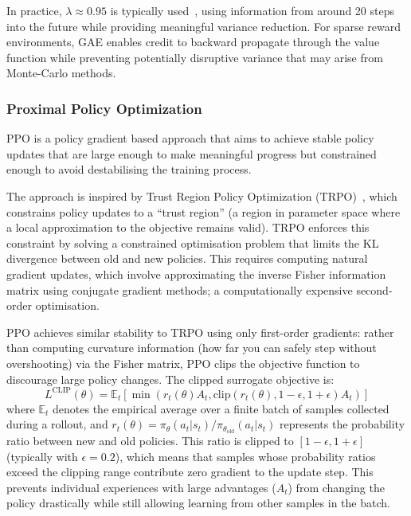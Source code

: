 In practice, $\lambda \approx 0.95$ is typically used~\citep{schulman_2018_highdimensional}, using information from around 20 steps into the future while providing meaningful variance reduction. For sparse reward environments, GAE enables credit to backward propagate through the value function while preventing potentially disruptive variance that may arise from Monte-Carlo methods.

\subsubsection{Proximal Policy Optimization}\label{subsubsec:ppo}

PPO is a policy gradient based approach that aims to achieve stable policy updates that are large enough to make meaningful progress but constrained enough to avoid destabilising the training process.

The approach is inspired by Trust Region Policy Optimization (TRPO)~\citep{schulman_2017_trust}, which constrains policy updates to a ``trust region'' (a region in parameter space where a local approximation to the objective remains valid). TRPO enforces this constraint by solving a constrained optimisation problem that limits the KL divergence between old and new policies. This requires computing natural gradient updates, which involve approximating the inverse Fisher information matrix using conjugate gradient methods; a computationally expensive second-order optimisation.

PPO achieves similar stability to TRPO using only first-order gradients: rather than computing curvature information (how far you can safely step without overshooting) via the Fisher matrix, PPO clips the objective function to discourage large policy changes. The clipped surrogate objective is:
\[
L^{\text{CLIP}}(\theta) = \mathbb{E}_t\left[\min\left(r_t(\theta)A_t, \text{clip}(r_t(\theta), 1-\epsilon, 1+\epsilon)A_t\right)\right]
\]
where $\mathbb{E}_t$ denotes the empirical average over a finite batch of samples collected during a rollout, and $r_t(\theta) = \pi_\theta(a_t|s_t)/\pi_{\theta_{\text{old}}}(a_t|s_t)$ represents the probability ratio between new and old policies. This ratio is clipped to $[1-\epsilon, 1+\epsilon]$ (typically with $\epsilon=0.2$), which means that samples whose probability ratios exceed the clipping range contribute zero gradient to the update step. This prevents individual experiences with large advantages ($A_t$) from changing the policy drastically while still allowing learning from other samples in the batch.

